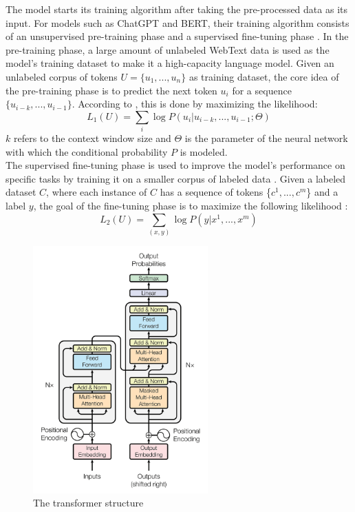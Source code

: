 \documentclass[runningheads]{llncs}
\begin{document}
\noindent \newline
The model starts its training algorithm after taking the pre-processed data as its input. For models such as ChatGPT and BERT, their training algorithm consists of an unsupervised pre-training phase and a supervised fine-tuning phase \cite{Roum23}.
In the pre-training phase, a large amount of unlabeled WebText data is used as the model's training dataset to make it a high-capacity language model. Given an unlabeled corpus of tokens $U=\{u_1,...,u_n\}$ as training dataset, the core idea of the pre-training phase is to 
predict the next token $u_i$ for a sequence $\{u_{i-k},...,u_{i-1}\}$. According to \cite{Radford18}, this is done by maximizing the likelihood: 
\begin{equation}
  L_1(U) = \sum_{i}\log{P(u_i|u_{i-k},...,u_{i-1}; \Theta)}
\end{equation}
$k$ refers to the context window size and $\Theta$ is the parameter of the neural network with which the conditional probability $P$ is modeled. \\
\noindent \newline
The supervised fine-tuning phase is used to improve the model's performance on specific tasks by training it on a smaller corpus of labeled data \cite{Roum23}. Given a labeled dataset $C$,
where each instance of $C$ has a sequence of tokens \{$c^1,...,c^m$\} and a label $y$, the goal of the fine-tuning phase is to maximize the following likelihood \cite{Radford18}:
\begin{equation}
  L_2(U) = \sum_{(x,y)}\log{P(y|x^1,...,x^m)}
\end{equation}

  \begin{figure}[htbp]
      \centering
      \includegraphics[width=0.6\textwidth]{attention1.jpg}
      \caption{The transformer structure \cite{Vaswani17}}
      \label{fig:attention}
  \end{figure}
\end{document}
